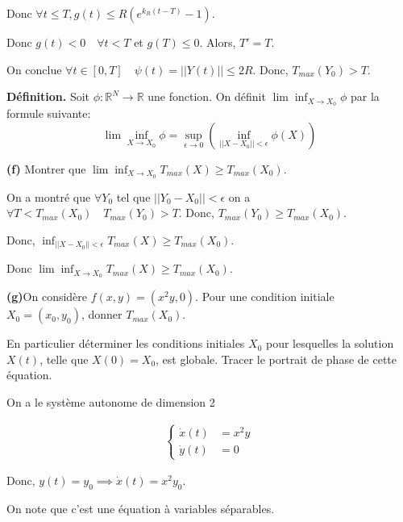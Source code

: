 \documentclass[french]{article}
\begin{document}
	Donc $\forall t \leq T, g(t) \leq  R(e^{k_R(t-T)} - 1)$.
	
	Donc $g(t) < 0 \quad \forall t < T$ et $g(T) \leq 0$. Alors, $T' = T$.
	
	On conclue $\forall t \in [0, T] \quad \psi(t) = ||Y(t)|| \leq 2R$. Donc, $T_{max}(Y_0) > T$. 

	\begin{tcolorbox}[colback=red!5!white,colframe=red!75!black]
		\textbf{Définition.} Soit $\phi: \mathbb{R}^N \to \mathbb{R}$ une fonction. On définit $\lim \inf_{X \to X_0} \phi$ par la formule suivante:
		\[ \lim \inf_{X \to X_0} \phi = \sup_{\epsilon \to 0} \left(\inf_{||X-X_0||<\epsilon} \phi(X)\right)\]
	\end{tcolorbox}

	\begin{tcolorbox}[colback=gray!5!white,colframe=gray!75!black]
		\textbf{\large{(f)}} Montrer que $\lim \inf_{X \to X_0} T_{max}(X) \geq T_{max}(X_0)$.
	\end{tcolorbox}

	On a montré que $\forall Y_0$ tel que $|| Y_0 - X_0 || < \epsilon$ on a $\forall T < T_{max}(X_0) \quad T_{max}(Y_0) > T$. Donc, $T_{max}(Y_0) \geq T_{max}(X_0)$.
	
	Donc, $\inf_{||X-X_0||<\epsilon} T_{max}(X) \geq T_{max}(X_0)$.
	
	Donc $\lim \inf_{X \to X_0} T_{max}(X) \geq T_{max}(X_0)$.

	\begin{tcolorbox}[colback=gray!5!white,colframe=gray!75!black]
		\textbf{\large{(g)}}On considère $f(x, y) = (x^2y,0)$. Pour une condition initiale $X_0 = (x_0, y_0)$, donner $T_{max}(X_0)$.
		
		En particulier déterminer les conditions initiales $X_0$ pour lesquelles la solution $X(t)$, telle que $X(0) = X_0$, est globale. Tracer le portrait de phase de cette équation. 
	\end{tcolorbox}

	On a le système autonome de dimension 2
	
	\begin{align}
		\begin{cases}
		\dot{x}(t) &= x^2y\\
		\dot{y}(t) &= 0
		\end{cases}
	\end{align}
	
	Donc, $y(t) = y_0 \implies \dot{x}(t) = x^2y_0$.
	
	On note que c'est une équation à variables séparables.
	
\end{document}
